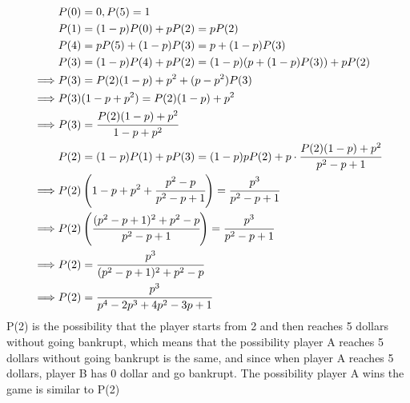 \documentclass[11pt]{article}
\begin{document}
\begin{equation*}
\begin{aligned}
&P(0) = 0, P(5) = 1 \\
&P(1) = (1-p)P(0) + pP(2) = pP(2) \\
&P(4) = pP(5) + (1-p)P(3) = p + (1-p)P(3)\\
&P(3) = (1-p)P(4) + pP(2) = (1-p)(p + (1-p)P(3)) + pP(2) \\
\implies &P(3) = P(2)(1-p) + p^2 + (p-p^2)P(3) \\
\implies &P(3)(1-p+p^2) = P(2)(1-p) + p^2 \\
\implies &P(3) = \cfrac{P(2)(1-p) + p^2}{1-p+p^2} \\
&P(2) = (1-p)P(1) + pP(3) = (1-p)pP(2) + p \cdot \cfrac{P(2)(1-p) + p^2}{p^2-p+1} \\
\implies &P(2)\left(  1-p+p^2 + \cfrac{p^2-p}{p^2-p+1}\right) = \cfrac{p^3}{p^2-p+1} \\
\implies &P(2)\left(\cfrac{(p^2-p+1)^2 + p^2-p}{p^2-p+1}\right) = \cfrac{p^3}{p^2-p+1} \\
\implies &P(2) = \cfrac{p^3}{(p^2-p+1)^2 + p^2-p} \\
\implies &P(2) = \cfrac{p^3}{p^4-2p^3+4p^2-3p+1}
\end{aligned}
\end{equation*}
P(2) is the possibility that the player starts from 2 and then reaches 5 dollars without going bankrupt, which means that the possibility player A reaches 5 dollars without going bankrupt is the same, and since when player A reaches 5 dollars, player B has 0 dollar and go bankrupt. The possibility player A wins the game is similar to P(2) 
\pagebreak
\end{document}
